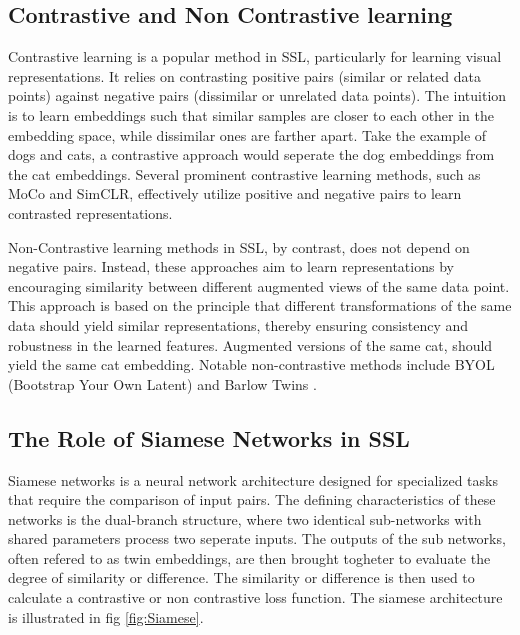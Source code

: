 \subsection{Contrastive and Non Contrastive learning}
Contrastive learning is a popular method in SSL, particularly for learning visual representations. It relies on contrasting positive pairs (similar or related data points) against negative pairs (dissimilar or unrelated data points). 
The intuition is to learn embeddings such that similar samples are closer to each other in the embedding space, while dissimilar ones are farther apart. Take the example of dogs and cats,
a contrastive approach would seperate the dog embeddings from the cat embeddings. Several prominent contrastive learning methods, such as MoCo\cite{MoCo} and SimCLR\cite{SimCLR}, effectively utilize positive and negative pairs to learn contrasted representations.

Non-Contrastive learning methods in SSL, by contrast, does not depend on negative pairs. Instead, these approaches aim to learn representations by encouraging similarity between different augmented views of the same data point. 
This approach is based on the principle that different transformations of the same data should yield similar representations, thereby ensuring consistency and robustness in the learned features.
Augmented versions of the same cat, should yield the same cat embedding. Notable non-contrastive methods include BYOL (Bootstrap Your Own Latent)\cite{BYOL} and Barlow Twins \cite{Barlow}.

\subsection{The Role of Siamese Networks in SSL}
Siamese networks\cite{Siamese} is a neural network architecture designed for specialized tasks that require the comparison of input pairs. The defining characteristics of these networks is the dual-branch structure, where two identical sub-networks with shared parameters process two seperate inputs.
The outputs of the sub networks, often refered to as twin embeddings, are then brought togheter to evaluate the degree of similarity or difference. The similarity or difference is then used to calculate a contrastive or non contrastive loss function.
The siamese architecture is illustrated in fig \ref{fig:Siamese}. 

